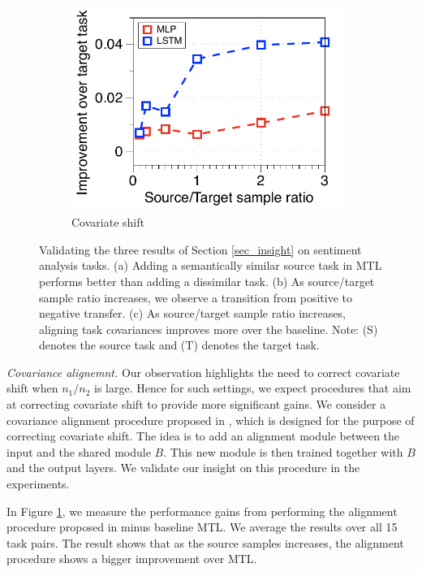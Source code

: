 \begin{figure}[!t]
\begin{subfigure}[b]{0.33\textwidth}
		\includegraphics[width=0.975\textwidth]{figures/ratio_alignment_norm_diff_all.pdf}
		\caption{Covariate shift}
		\label{fig_ab_cov}
	\end{subfigure}
	\caption{Validating the three results of Section \ref{sec_insight} on sentiment analysis tasks. (a) Adding a semantically similar source task in MTL performs better than adding a dissimilar task.
	(b) As source/target sample ratio increases, we observe a transition from positive to negative transfer.
	(c) As source/target sample ratio increases, aligning task covariances \cite{WZR20} improves more over the baseline.
	Note: (S) denotes the source task and (T) denotes the target task.}
	\label{fig_ablation}
	\vspace{-0.15in}
\end{figure}





\noindent\textit{Covariance alignemnt.}
Our observation highlights the need to correct covariate shift when $n_1 / n_2$ is large.
Hence for such settings, we expect procedures that aim at correcting covariate shift to provide more significant gains.
We consider a covariance alignment procedure proposed in \cite{WZR20}, which is designed for the purpose of correcting covariate shift.
The idea is to add an alignment module between the input and the shared module $B$.
This new module is then trained together with $B$ and the output layers.
We validate our insight on this procedure in the experiments.


In Figure \ref{fig_ab_cov}, we measure the performance gains from performing the alignment procedure proposed in \cite{WZR20} minus baseline MTL.
We average the results over all 15 task pairs.
The result shows that as the source samples increases, the alignment procedure shows a bigger improvement over MTL.

